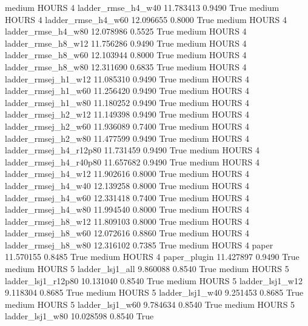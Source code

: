     medium    HOURS                 4     ladder_rmse_h4_w40  11.783413      0.9490    True
    medium    HOURS                 4     ladder_rmse_h4_w60  12.096655      0.8000    True
    medium    HOURS                 4     ladder_rmse_h4_w80  12.078986      0.5525    True
    medium    HOURS                 4     ladder_rmse_h8_w12  11.756286      0.9490    True
    medium    HOURS                 4     ladder_rmse_h8_w60  12.103944      0.8000    True
    medium    HOURS                 4     ladder_rmse_h8_w80  12.311690      0.6835    True
    medium    HOURS                 4    ladder_rmsej_h1_w12  11.085310      0.9490    True
    medium    HOURS                 4    ladder_rmsej_h1_w60  11.256420      0.9490    True
    medium    HOURS                 4    ladder_rmsej_h1_w80  11.180252      0.9490    True
    medium    HOURS                 4    ladder_rmsej_h2_w12  11.149398      0.9490    True
    medium    HOURS                 4    ladder_rmsej_h2_w60  11.936089      0.7400    True
    medium    HOURS                 4    ladder_rmsej_h2_w80  11.477599      0.9490    True
    medium    HOURS                 4 ladder_rmsej_h4_r12p80  11.731459      0.9490    True
    medium    HOURS                 4 ladder_rmsej_h4_r40p80  11.657682      0.9490    True
    medium    HOURS                 4    ladder_rmsej_h4_w12  11.902616      0.8000    True
    medium    HOURS                 4    ladder_rmsej_h4_w40  12.139258      0.8000    True
    medium    HOURS                 4    ladder_rmsej_h4_w60  12.331418      0.7400    True
    medium    HOURS                 4    ladder_rmsej_h4_w80  11.994540      0.8000    True
    medium    HOURS                 4    ladder_rmsej_h8_w12  11.809103      0.8000    True
    medium    HOURS                 4    ladder_rmsej_h8_w60  12.072616      0.8860    True
    medium    HOURS                 4    ladder_rmsej_h8_w80  12.316102      0.7385    True
    medium    HOURS                 4                  paper  11.570155      0.8485    True
    medium    HOURS                 4           paper_plugin  11.427897      0.9490    True
    medium    HOURS                 5        ladder_lsj1_all   9.860088      0.8540    True
    medium    HOURS                 5     ladder_lsj1_r12p80  10.131040      0.8540    True
    medium    HOURS                 5        ladder_lsj1_w12   9.118304      0.8685    True
    medium    HOURS                 5        ladder_lsj1_w40   9.251453      0.8685    True
    medium    HOURS                 5        ladder_lsj1_w60   9.784634      0.8540    True
    medium    HOURS                 5        ladder_lsj1_w80  10.028598      0.8540    True
